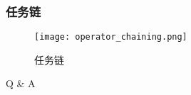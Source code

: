\documentclass{beamer}
\begin{document}
  \begin{frame}
      \frametitle{任务链}
  
      \begin{figure}
        \centering
        \texttt{[image: operator\_chaining.png]}
        \caption{任务链}
      \end{figure}      
  
  \end{frame}

  \begin{frame}[plain,c]
    
    \begin{center}
    \Huge Q \& A
    \end{center}
    
  \end{frame}
\end{document}
